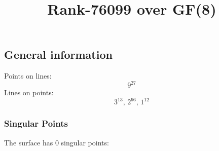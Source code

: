 \documentclass{article}
\newcommand\setTBstruts{\def\T{\rule{0pt}{2.6ex}}%
\def\B{\rule[-1.2ex]{0pt}{0pt}}}
\begin{document}
 
\setTBstruts



{\allowdisplaybreaks%






\title{Rank-76099 over GF(8)}
\author{}%
\maketitle%
%
{}



\subsection*{General information}
Points on lines:
$$
9^{27}$$
Lines on points:
$$
3^{13},\,2^{96},\,1^{12}$$
\subsubsection*{Singular Points}
The surface has 0 singular points:\\
\begin{align*}
\end{align*}
}
\end{document}

